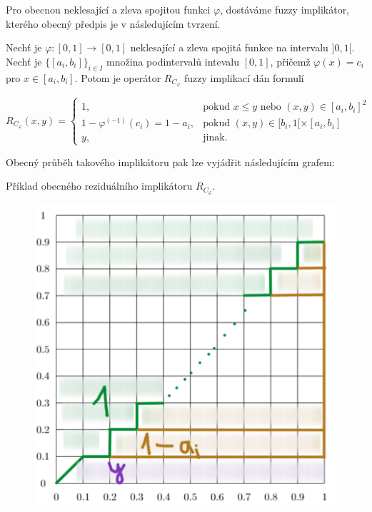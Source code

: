 Pro obecnou neklesající a zleva spojitou funkci $\varphi$,  dostáváme fuzzy implikátor, kterého obecný předpis je v následujícím tvrzení.
\begin{sentence}
\cite{mitav}
\label{r-impl}
     Nechť je $\varphi:[0,1]\rightarrow [0,1]$
neklesající a zleva spojitá funkce na intervalu $]0,1[$.
Nechť je
$\{[a_i,b_i]\}_{i\in I}$ množina podintervalů intevalu $[0,1]$, přičemž $\varphi(x)=c_i$ pro $x\in
[a_i,b_i]$.
Potom je operátor $R_{C_\varphi}$ fuzzy implikací dán formulí

$$ R_{C_\varphi}(x,y) = \begin{cases} 1, & \mbox{pokud } x\leq y \mbox{ nebo } (x,y) \in [a_i,b_i]^2\\
1-\varphi^{(-1)}(c_i)=1-a_i, &\mbox {pokud }
(x,y)\in [b_i,1[\times[a_i,b_i]
\\ y, &\mbox {jinak.}
\end{cases} $$
\end{sentence}

Obecný průběh takového implikátoru pak lze vyjádřit následujícím grafem:
\begin{graph}
    Příklad obecného reziduálního implikátoru $R_{C_\varphi}$.
    \begin{figure}[H]
                \hspace{-1cm}
                \includegraphics[scale=0.4]{template-fig/r-impliphi.pdf}
                \centering
            \end{figure}
\end{graph}


